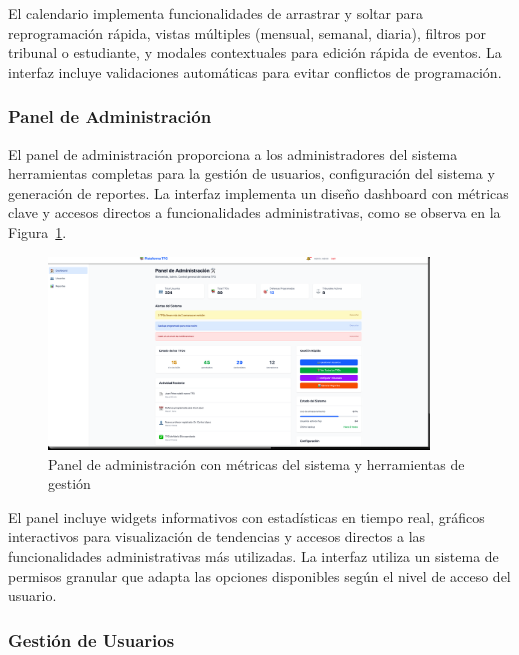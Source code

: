 \documentclass[12pt,a4paper,oneside]{report}
\begin{document}
El calendario implementa funcionalidades de arrastrar y soltar para reprogramación rápida, vistas múltiples (mensual, semanal, diaria), filtros por tribunal o estudiante, y modales contextuales para edición rápida de eventos. La interfaz incluye validaciones automáticas para evitar conflictos de programación.

\subsubsection{Panel de Administración}\label{panel-de-administracion}

El panel de administración proporciona a los administradores del sistema herramientas completas para la gestión de usuarios, configuración del sistema y generación de reportes. La interfaz implementa un diseño dashboard con métricas clave y accesos directos a funcionalidades administrativas, como se observa en la Figura~\ref{fig:panel-administracion}.

\begin{figure}[H]
\centering
\includegraphics[width=0.9\textwidth]{processed/images/panel_administracion.png}
\caption{Panel de administración con métricas del sistema y herramientas de gestión}
\label{fig:panel-administracion}
\end{figure}

El panel incluye widgets informativos con estadísticas en tiempo real, gráficos interactivos para visualización de tendencias y accesos directos a las funcionalidades administrativas más utilizadas. La interfaz utiliza un sistema de permisos granular que adapta las opciones disponibles según el nivel de acceso del usuario.

\subsubsection{Gestión de Usuarios}\label{gestion-de-usuarios}
\end{document}
